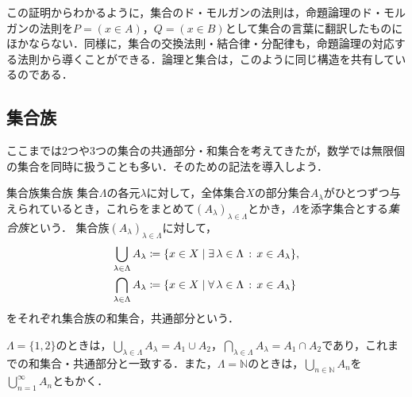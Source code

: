 \begin{remark}[論理の法則と集合の法則]
  この証明からわかるように，集合のド・モルガンの法則は，命題論理のド・モルガンの法則を$P = (x \in A)$，$Q = (x \in B)$として集合の言葉に翻訳したものにほかならない．同様に，集合の交換法則・結合律・分配律も，命題論理の対応する法則から導くことができる．論理と集合は，このように同じ構造を共有しているのである．
\end{remark}

\subsection{集合族}

ここまでは$2$つや$3$つの集合の共通部分・和集合を考えてきたが，数学では無限個の集合を同時に扱うことも多い．そのための記法を導入しよう．

\begin{definition}{集合族}{集合族}
  集合$\Lambda$の各元$\lambda$に対して，全体集合$X$の部分集合$A_\lambda$がひとつずつ与えられているとき，これらをまとめて$(A_\lambda)_{\lambda \in \Lambda}$とかき，$\Lambda$を添字集合とする\emph{集合族}という．
  集合族$(A_\lambda)_{\lambda \in \Lambda}$に対して，
  \begin{align*}
    \bigcup_{\lambda \in \Lambda} A_\lambda & \coloneqq \{ x \in X \mid \exists\, \lambda \in \Lambda \,:\, x \in A_\lambda \}, \\
    \bigcap_{\lambda \in \Lambda} A_\lambda & \coloneqq \{ x \in X \mid \forall\, \lambda \in \Lambda \,:\, x \in A_\lambda \}
  \end{align*}
  をそれぞれ集合族の和集合，共通部分という．
\end{definition}

$\Lambda = \{1, 2\}$のときは，$\bigcup_{\lambda \in \Lambda} A_\lambda = A_1 \cup A_2$，$\bigcap_{\lambda \in \Lambda} A_\lambda = A_1 \cap A_2$であり，これまでの和集合・共通部分と一致する．また，$\Lambda = \mathbb{N}$のときは，$\bigcup_{n \in \mathbb{N}} A_n$を$\bigcup_{n=1}^{\infty} A_n$ともかく．

